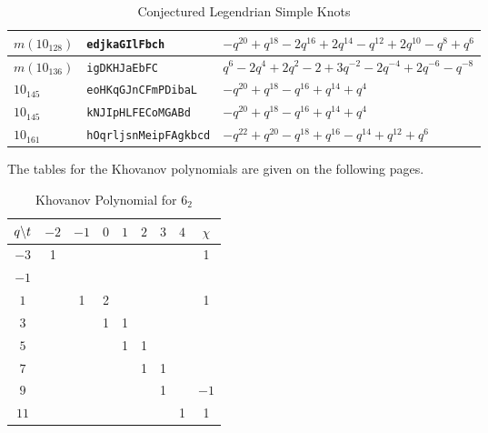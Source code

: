 \documentclass{article}
\theoremstyle{plain}
\begin{document}
\begin{table}
{\begin{tabular}{| l | l | l |}
                    \hline
                    $m(10_{128})$&\texttt{edjkaGIlFbch}&$-q^{20}+q^{18}-2q^{16}+2q^{14}-q^{12}+2q^{10}-q^{8}+q^{6}$\\
                    \hline
                    $m(10_{136})$&\texttt{igDKHJaEbFC}&$q^{6}-2q^{4}+2q^{2}-2+3q^{-2}-2q^{-4}+2q^{-6}-q^{-8}$\\
                    \hline
                    $10_{145}$&\texttt{eoHKqGJnCFmPDibaL}&$-q^{20}+q^{18}-q^{16}+q^{14}+q^{4}$\\
                    \hline
                    $10_{145}$&\texttt{kNJIpHLFECoMGABd}&$-q^{20}+q^{18}-q^{16}+q^{14}+q^{4}$\\
                    \hline
                    $10_{161}$&\texttt{hOqrljsnMeipFAgkbcd}&$-q^{22}+q^{20}-q^{18}+q^{16}-q^{14}+q^{12}+q^{6}$\\
                    \hline
                \end{tabular}%
            }
            \caption{Conjectured Legendrian Simple Knots}
            \label{fig:conj_leg_simp_knots}
        \end{table}
        The tables for the Khovanov polynomials are given
        on the following pages.
        \newpage
        \begin{table}
            \centering
            \begin{tabular}{| c | c | c | c | c | c | c | c | c |}
                \hline
                $q\symbol{92}t$&$-2$&$-1$&$0$&$1$&$2$&$3$&$4$&$\chi$\\
                \hline
                $-3$&1&&&&&&&1\\
                \hline
                $-1$&&&&&&&&\\
                \hline
                $1$&&1&2&&&&&1\\
                \hline
                $3$&&&1&1&&&&\\
                \hline
                $5$&&&&1&1&&&\\
                \hline
                $7$&&&&&1&1&&\\
                \hline
                $9$&&&&&&1&&$-1$\\
                \hline
                $11$&&&&&&&1&1\\
                \hline
            \end{tabular}
            \caption{Khovanov Polynomial for $6_{2}$}
        \end{table}
\end{document}
